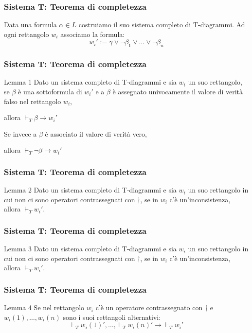 \documentclass[notheorem,aspectratio=169]{beamer}
\begin{document}
\begin{frame}
\frametitle{Sistema T: Teorema di completezza}
Data una formula $\alpha \in L$ costruiamo il suo sistema completo di T-diagrammi.
Ad ogni rettangolo $w_i$ associamo la formula:
$$w_i' := \gamma \lor \neg \beta_1 \lor \ldots \lor \neg \beta_n$$
\end{frame}

\begin{frame}
\frametitle{Sistema T: Teorema di completezza}
\begin{block}{Lemma 1}
Dato un sistema completo di T-diagrammi e sia $w_i$ un suo rettangolo,
se $\beta$ è una sottoformula di $w_i'$ e a $\beta$ è assegnato univocamente il valore di verità falso
nel rettangolo $w_i$,

allora $\vdash_T \beta \rightarrow w_i'$

Se invece a $\beta$ è associato il valore di verità vero,


allora $\vdash_T \neg \beta \rightarrow w_i'$
\end{block}
\end{frame}

\begin{frame}
\frametitle{Sistema T: Teorema di completezza}
\begin{block}{Lemma 2}
Dato un sistema completo di T-diagrammi e sia $w_i$ un suo rettangolo in cui
non ci sono operatori contrassegnati con $\dagger$,
se in $w_i$ c'è un'inconsistenza, allora $\vdash_T w_i'$.
\end{block}
\end{frame}

\begin{frame}
\frametitle{Sistema T: Teorema di completezza}
\begin{block}{Lemma 3}
Dato un sistema completo di T-diagrammi e sia $w_i$ un suo rettangolo in cui
non ci sono operatori contrassegnati con $\dagger$,
se in $w_i$ c'è un'inconsistenza, allora $\vdash_T w_i'$.
\end{block}
\end{frame}

\begin{frame}
\frametitle{Sistema T: Teorema di completezza}

\begin{block}{Lemma 4}
Se nel rettangolo $w_i$ c'è un operatore contrassegnato con $\dagger$
e $w_i(1), \ldots, w_i(n)$ sono i suoi rettangoli alternativi:
$$\vdash_T w_i(1)', \ldots, \vdash_T w_i(n)' \rightarrow \vdash_T w_i'$$
\end{block}
\end{frame}
\end{document}
